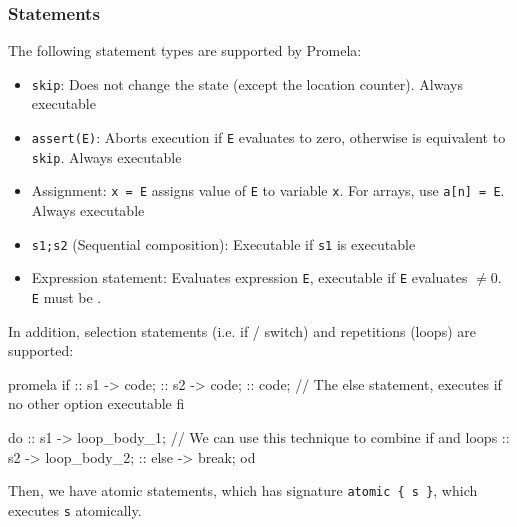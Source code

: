 \subsubsection{Statements}
The following statement types are supported by Promela:
\begin{itemize}
    \item \texttt{skip}: Does not change the state (except the location counter). Always executable
    \item \texttt{assert(E)}: Aborts execution if \texttt{E} evaluates to zero, otherwise is equivalent to \texttt{skip}. Always executable
    \item Assignment: \texttt{x = E} assigns value of \texttt{E} to variable \texttt{x}. For arrays, use \texttt{a[n] = E}. Always executable
    \item \texttt{s1;s2} (Sequential composition): Executable if \texttt{s1} is executable
    \item Expression statement: Evaluates expression \texttt{E}, executable if \texttt{E} evaluates $\neq 0$. \texttt{E} must be .
\end{itemize}

In addition, selection statements (i.e. if / switch) and repetitions (loops) are supported:
\begin{code}{promela}
    if
    :: s1 -> code;
    :: s2 -> code;
    :: code; // The else statement, executes if no other option executable
    fi

    do
    :: s1 -> loop_body_1; // We can use this technique to combine if and loops
    :: s2 -> loop_body_2;
    :: else -> break;
    od
\end{code}

Then, we have atomic statements, which has signature \texttt{atomic \{ s \}}, which executes \texttt{s} atomically.
